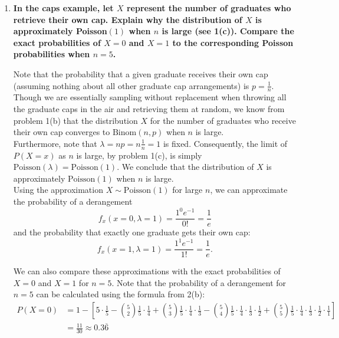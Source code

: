 \begin{enumerate}
    \item \textbf{In the caps example, let $X$ represent the number of graduates who retrieve their own cap. Explain why the distribution of $X$ is approximately
    Poisson$(1)$ when $n$ is large (see 1(c)). Compare the exact probabilities of $X = 0$ and $X=1$ to the corresponding Poisson probabilities when $n=5$.}

    Note that the probability that a given graduate receives their own cap (assuming nothing about all other graduate cap arrangements) is $p = \frac{1}{n}$. Though we are essentially sampling without replacement when throwing all the graduate caps in the air and retrieving them at random, we know from problem 1(b) that the distribution $X$ for the number of graduates who receive their own cap converges to $\mathrm{Binom}(n, p)$ when $n$ is large. \\

    Furthermore, note that $\lambda = np = n\frac{1}{n} = 1$ is fixed. Consequently, the limit of $P(X = x)$ as $n$ is large, by problem 1(c), is simply $\mathrm{Poisson}(\lambda) = \mathrm{Poisson}(1)$. We conclude that the distribution of $X$ is approximately $\mathrm{Poisson}(1)$ when $n$ is large. \\

    Using the approximation $X \sim \mathrm{Poisson}(1)$ for large $n$, we can approximate the probability of a derangement
    \[ 
        f_x(x=0, \lambda = 1) = \frac{1^0 e^{-1}}{0!} = \frac{1}{e}
    \]
    and the probability that exactly one graduate gets their own cap:
    \[ 
        f_x(x=1, \lambda = 1) = \frac{1^1 e^{-1}}{1!} = \frac{1}{e}.
    \]

    We can also compare these approximations with the exact probabilities of $X=0$ and $X=1$ for $n=5$. Note that the probability of a derangement for $n=5$ can be calculated using the formula from 2(b):
    \begin{align*}
        P(X = 0)&= 1 - \left[ 5 \cdot \frac{1}{5} - \binom{5}{2}\frac{1}{5} \cdot \frac{1}{4} + 
        \binom{5}{3}\frac{1}{5} \cdot \frac{1}{4} \cdot \frac{1}{3} - \binom{5}{4}\frac{1}{5} \cdot \frac{1}{4} \cdot \frac{1}{3} \cdot \frac{1}{2}
        + \binom{5}{5}\frac{1}{5} \cdot \frac{1}{4} \cdot \frac{1}{3} \cdot \frac{1}{2} \cdot \frac{1}{1}\right] \\
        &= \frac{11}{30} \approx 0.3\overline{6}
    \end{align*}


\end{enumerate}
